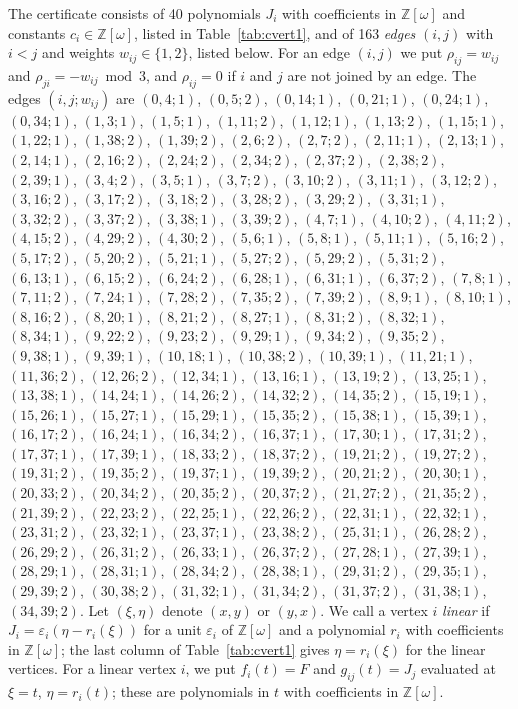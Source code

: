 \documentclass[11pt]{article}
\newcommand{\Z}{\mathbb{Z}}
\begin{document}
The certificate consists of 40 polynomials $J_i$ with coefficients in $\Z[\omega]$ and constants $c_i\in\Z[\omega]$, listed in Table~\ref{tab:cvert1}, and of 163 \emph{edges} $(i,j)$ with $i<j$ and weights $w_{ij}\in\{1,2\}$, listed below. For an edge $(i,j)$ we put $\rho_{ij}=w_{ij}$ and $\rho_{ji}=-w_{ij}\bmod 3$, and $\rho_{ij}=0$ if $i$ and $j$ are not joined by an edge.
The edges $(i,j;w_{ij})$ are $(0,4;1)$, $(0,5;2)$, $(0,14;1)$, $(0,21;1)$, $(0,24;1)$, $(0,34;1)$, $(1,3;1)$, $(1,5;1)$, $(1,11;2)$, $(1,12;1)$, $(1,13;2)$, $(1,15;1)$, $(1,22;1)$, $(1,38;2)$, $(1,39;2)$, $(2,6;2)$, $(2,7;2)$, $(2,11;1)$, $(2,13;1)$, $(2,14;1)$, $(2,16;2)$, $(2,24;2)$, $(2,34;2)$, $(2,37;2)$, $(2,38;2)$, $(2,39;1)$, $(3,4;2)$, $(3,5;1)$, $(3,7;2)$, $(3,10;2)$, $(3,11;1)$, $(3,12;2)$, $(3,16;2)$, $(3,17;2)$, $(3,18;2)$, $(3,28;2)$, $(3,29;2)$, $(3,31;1)$, $(3,32;2)$, $(3,37;2)$, $(3,38;1)$, $(3,39;2)$, $(4,7;1)$, $(4,10;2)$, $(4,11;2)$, $(4,15;2)$, $(4,29;2)$, $(4,30;2)$, $(5,6;1)$, $(5,8;1)$, $(5,11;1)$, $(5,16;2)$, $(5,17;2)$, $(5,20;2)$, $(5,21;1)$, $(5,27;2)$, $(5,29;2)$, $(5,31;2)$, $(6,13;1)$, $(6,15;2)$, $(6,24;2)$, $(6,28;1)$, $(6,31;1)$, $(6,37;2)$, $(7,8;1)$, $(7,11;2)$, $(7,24;1)$, $(7,28;2)$, $(7,35;2)$, $(7,39;2)$, $(8,9;1)$, $(8,10;1)$, $(8,16;2)$, $(8,20;1)$, $(8,21;2)$, $(8,27;1)$, $(8,31;2)$, $(8,32;1)$, $(8,34;1)$, $(9,22;2)$, $(9,23;2)$, $(9,29;1)$, $(9,34;2)$, $(9,35;2)$, $(9,38;1)$, $(9,39;1)$, $(10,18;1)$, $(10,38;2)$, $(10,39;1)$, $(11,21;1)$, $(11,36;2)$, $(12,26;2)$, $(12,34;1)$, $(13,16;1)$, $(13,19;2)$, $(13,25;1)$, $(13,38;1)$, $(14,24;1)$, $(14,26;2)$, $(14,32;2)$, $(14,35;2)$, $(15,19;1)$, $(15,26;1)$, $(15,27;1)$, $(15,29;1)$, $(15,35;2)$, $(15,38;1)$, $(15,39;1)$, $(16,17;2)$, $(16,24;1)$, $(16,34;2)$, $(16,37;1)$, $(17,30;1)$, $(17,31;2)$, $(17,37;1)$, $(17,39;1)$, $(18,33;2)$, $(18,37;2)$, $(19,21;2)$, $(19,27;2)$, $(19,31;2)$, $(19,35;2)$, $(19,37;1)$, $(19,39;2)$, $(20,21;2)$, $(20,30;1)$, $(20,33;2)$, $(20,34;2)$, $(20,35;2)$, $(20,37;2)$, $(21,27;2)$, $(21,35;2)$, $(21,39;2)$, $(22,23;2)$, $(22,25;1)$, $(22,26;2)$, $(22,31;1)$, $(22,32;1)$, $(23,31;2)$, $(23,32;1)$, $(23,37;1)$, $(23,38;2)$, $(25,31;1)$, $(26,28;2)$, $(26,29;2)$, $(26,31;2)$, $(26,33;1)$, $(26,37;2)$, $(27,28;1)$, $(27,39;1)$, $(28,29;1)$, $(28,31;1)$, $(28,34;2)$, $(28,38;1)$, $(29,31;2)$, $(29,35;1)$, $(29,39;2)$, $(30,38;2)$, $(31,32;1)$, $(31,34;2)$, $(31,37;2)$, $(31,38;1)$, $(34,39;2)$.
Let $(\xi,\eta)$ denote $(x,y)$ or $(y,x)$. We call a vertex $i$ \emph{linear} if $J_i=\varepsilon_i(\eta-r_i(\xi))$ for a unit $\varepsilon_i$ of $\Z[\omega]$ and a polynomial $r_i$ with coefficients in $\Z[\omega]$; the last column of Table~\ref{tab:cvert1} gives $\eta=r_i(\xi)$ for the linear vertices. For a linear vertex $i$, we put $f_i(t)=F$ and $g_{ij}(t)=J_j$ evaluated at $\xi=t$, $\eta=r_i(t)$; these are polynomials in $t$ with coefficients in $\Z[\omega]$.
\end{document}
